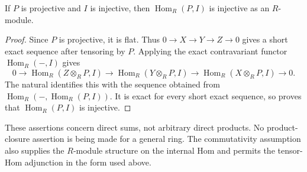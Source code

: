 \begin{corollary}\label{cor-hom-projective-injective}
If $P$ is projective and $I$ is injective, then $\operatorname{Hom}_R(P,I)$ is injective as an $R$-module.
\end{corollary}
\begin{proof}\label{proof-hom-projective-injective}
Since $P$ is projective, it is flat. Thus $0\to X\to Y\to Z\to0$ gives a short exact sequence after tensoring by $P$. Applying the exact contravariant functor $\operatorname{Hom}_R(-,I)$ gives
\[
0\to\operatorname{Hom}_R(Z\otimes_RP,I)
\to\operatorname{Hom}_R(Y\otimes_RP,I)
\to\operatorname{Hom}_R(X\otimes_RP,I)\to0.
\]
The natural  identifies this with the sequence obtained from $\operatorname{Hom}_R(-,\operatorname{Hom}_R(P,I))$. It is exact for every short exact sequence, so  proves that $\operatorname{Hom}_R(P,I)$ is injective.
\end{proof}

\begin{remark}\label{remark-flat-closure-scope}
These assertions concern direct sums, not arbitrary direct products. No product-closure assertion is being made for a general ring. The commutativity assumption also supplies the $R$-module structure on the internal Hom and permits the tensor-Hom adjunction in the form used above.
\end{remark}
